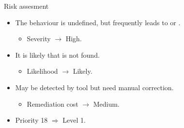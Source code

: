 \begin{frame}[t]{Risk assesment}
\begin{itemize}
  \item The behaviour is undefined, but frequently leads to 
        or .
    \begin{itemize}
      \item Severity $\rightarrow$ High.
    \end{itemize}

  \vfill
  \item It is likely that is not found.
    \begin{itemize}
      \item Likelihood $\rightarrow$ Likely.
    \end{itemize}

  \vfill
  \item May be detected by tool but need manual correction.
    \begin{itemize}
      \item Remediation cost $\rightarrow$ Medium.
    \end{itemize}

  \vfill
  \item Priority 18 $\Rightarrow$ Level 1.
\end{itemize}
\end{frame}
